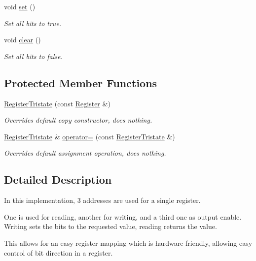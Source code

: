 \begin{CompactItemize}
void \hyperlink{classmprace_1_1RegisterTristate_a6}{set} ()
\begin{CompactList}\small\item\em Set all bits to true. \item\end{CompactList}\item 
void \hyperlink{classmprace_1_1RegisterTristate_a7}{clear} ()
\begin{CompactList}\small\item\em Set all bits to false. \item\end{CompactList}\end{CompactItemize}
\subsection*{Protected Member Functions}
\begin{CompactItemize}
\item 
\hyperlink{classmprace_1_1RegisterTristate_b0}{Register\-Tristate} (const \hyperlink{classmprace_1_1Register}{Register} \&)
\begin{CompactList}\small\item\em Overrides default copy constructor, does nothing. \item\end{CompactList}\item 
\hyperlink{classmprace_1_1RegisterTristate}{Register\-Tristate} \& \hyperlink{classmprace_1_1RegisterTristate_b1}{operator=} (const \hyperlink{classmprace_1_1RegisterTristate}{Register\-Tristate} \&)
\begin{CompactList}\small\item\em Overrides default assignment operation, does nothing. \item\end{CompactList}\end{CompactItemize}


\subsection{Detailed Description}
In this implementation, 3 addresses are used for a single register. 

One is used for reading, another for writing, and a third one as output enable. Writing sets the bits to the requested value, reading returns the value.

This allows for an easy register mapping which is hardware friendly, allowing easy control of bit direction in a register.

